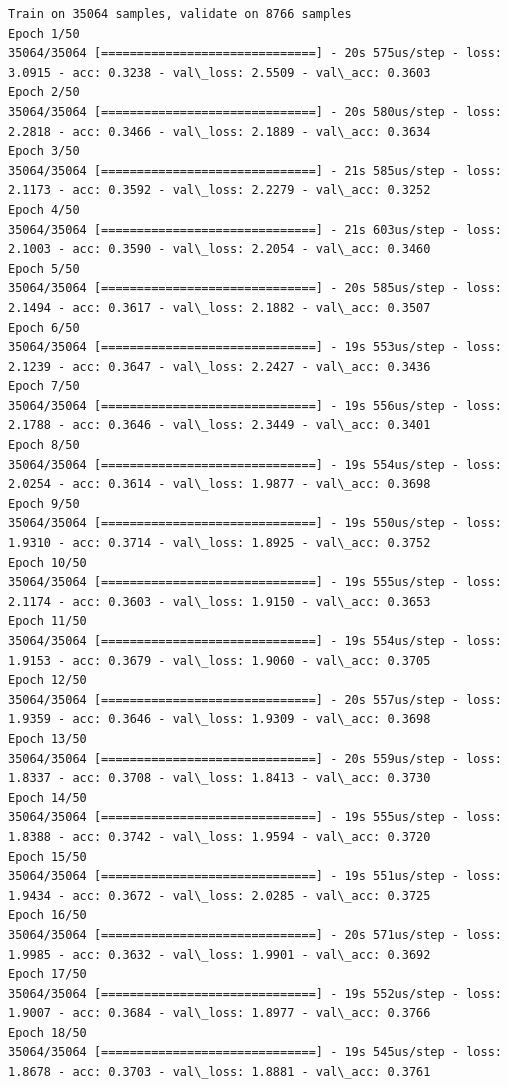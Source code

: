 \documentclass[11pt]{article}
\begin{document}
    \begin{Verbatim}[commandchars=\\\{\}]
Train on 35064 samples, validate on 8766 samples
Epoch 1/50
35064/35064 [==============================] - 20s 575us/step - loss: 3.0915 - acc: 0.3238 - val\_loss: 2.5509 - val\_acc: 0.3603
Epoch 2/50
35064/35064 [==============================] - 20s 580us/step - loss: 2.2818 - acc: 0.3466 - val\_loss: 2.1889 - val\_acc: 0.3634
Epoch 3/50
35064/35064 [==============================] - 21s 585us/step - loss: 2.1173 - acc: 0.3592 - val\_loss: 2.2279 - val\_acc: 0.3252
Epoch 4/50
35064/35064 [==============================] - 21s 603us/step - loss: 2.1003 - acc: 0.3590 - val\_loss: 2.2054 - val\_acc: 0.3460
Epoch 5/50
35064/35064 [==============================] - 20s 585us/step - loss: 2.1494 - acc: 0.3617 - val\_loss: 2.1882 - val\_acc: 0.3507
Epoch 6/50
35064/35064 [==============================] - 19s 553us/step - loss: 2.1239 - acc: 0.3647 - val\_loss: 2.2427 - val\_acc: 0.3436
Epoch 7/50
35064/35064 [==============================] - 19s 556us/step - loss: 2.1788 - acc: 0.3646 - val\_loss: 2.3449 - val\_acc: 0.3401
Epoch 8/50
35064/35064 [==============================] - 19s 554us/step - loss: 2.0254 - acc: 0.3614 - val\_loss: 1.9877 - val\_acc: 0.3698
Epoch 9/50
35064/35064 [==============================] - 19s 550us/step - loss: 1.9310 - acc: 0.3714 - val\_loss: 1.8925 - val\_acc: 0.3752
Epoch 10/50
35064/35064 [==============================] - 19s 555us/step - loss: 2.1174 - acc: 0.3603 - val\_loss: 1.9150 - val\_acc: 0.3653
Epoch 11/50
35064/35064 [==============================] - 19s 554us/step - loss: 1.9153 - acc: 0.3679 - val\_loss: 1.9060 - val\_acc: 0.3705
Epoch 12/50
35064/35064 [==============================] - 20s 557us/step - loss: 1.9359 - acc: 0.3646 - val\_loss: 1.9309 - val\_acc: 0.3698
Epoch 13/50
35064/35064 [==============================] - 20s 559us/step - loss: 1.8337 - acc: 0.3708 - val\_loss: 1.8413 - val\_acc: 0.3730
Epoch 14/50
35064/35064 [==============================] - 19s 555us/step - loss: 1.8388 - acc: 0.3742 - val\_loss: 1.9594 - val\_acc: 0.3720
Epoch 15/50
35064/35064 [==============================] - 19s 551us/step - loss: 1.9434 - acc: 0.3672 - val\_loss: 2.0285 - val\_acc: 0.3725
Epoch 16/50
35064/35064 [==============================] - 20s 571us/step - loss: 1.9985 - acc: 0.3632 - val\_loss: 1.9901 - val\_acc: 0.3692
Epoch 17/50
35064/35064 [==============================] - 19s 552us/step - loss: 1.9007 - acc: 0.3684 - val\_loss: 1.8977 - val\_acc: 0.3766
Epoch 18/50
35064/35064 [==============================] - 19s 545us/step - loss: 1.8678 - acc: 0.3703 - val\_loss: 1.8881 - val\_acc: 0.3761

\end{Verbatim}
\end{document}

